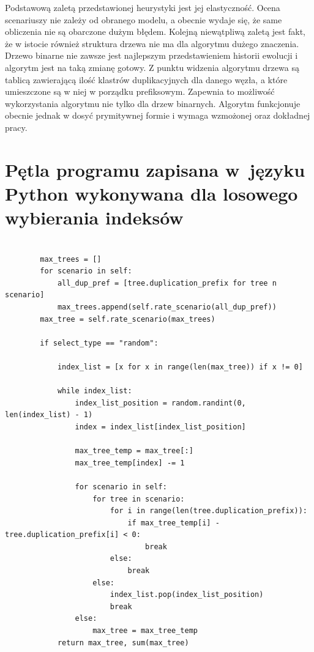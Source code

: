 \documentclass[licencjacka]{pracamgr}
\begin{document}
Podstawową zaletą przedstawionej heurystyki jest jej elastyczność. Ocena scenariuszy nie zależy od obranego modelu, a obecnie wydaje się, że same obliczenia nie są obarczone dużym błędem. Kolejną niewątpliwą zaletą jest fakt, że w istocie również struktura drzewa nie ma dla algorytmu dużego znaczenia. Drzewo binarne nie zawsze jest najlepszym przedstawieniem historii ewolucji i algorytm jest na taką zmianę gotowy. Z punktu widzenia algorytmu drzewa są tablicą zawierającą ilość klastrów duplikacyjnych dla danego węzła, a które umieszczone są w niej w porządku prefiksowym. Zapewnia to możliwość wykorzystania algorytmu nie tylko dla drzew binarnych. Algorytm funkcjonuje obecnie jednak w dosyć prymitywnej formie i wymaga wzmożonej oraz dokładnej pracy.  

\appendix

\chapter{Pętla programu zapisana w~języku Python wykonywana dla losowego wybierania indeksów}

\begin{verbatim}

		max_trees = []
        for scenario in self:
            all_dup_pref = [tree.duplication_prefix for tree n scenario]
            max_trees.append(self.rate_scenario(all_dup_pref))
        max_tree = self.rate_scenario(max_trees)

        if select_type == "random":

            index_list = [x for x in range(len(max_tree)) if x != 0]

            while index_list:
                index_list_position = random.randint(0, len(index_list) - 1)
                index = index_list[index_list_position]

                max_tree_temp = max_tree[:]
                max_tree_temp[index] -= 1

                for scenario in self:
                    for tree in scenario:
                        for i in range(len(tree.duplication_prefix)):
                            if max_tree_temp[i] - tree.duplication_prefix[i] < 0:
                                break
                        else:
                            break
                    else:
                        index_list.pop(index_list_position)
                        break
                else:
                    max_tree = max_tree_temp
            return max_tree, sum(max_tree)
\end{verbatim}
\end{document}
